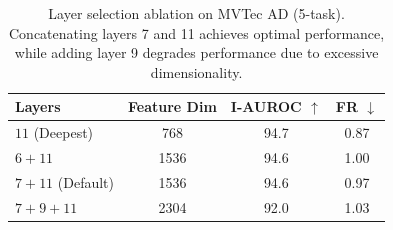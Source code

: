 \begin{table}[t]
\centering
\caption{Layer selection ablation on MVTec AD (5-task). Concatenating layers 7 and 11 achieves optimal performance, while adding layer 9 degrades performance due to excessive dimensionality.}
\label{tab:layer_ablation}
\begin{tabular}{lccc}
\toprule
Layers & Feature Dim & I-AUROC $\uparrow$ & FR $\downarrow$ \\
\midrule
$11$ (Deepest) & 768 & 94.7 & 0.87 \\
$6 + 11$ & 1536 & 94.6 & 1.00 \\
$7 + 11$ (Default) & 1536 & 94.6 & 0.97 \\
$7 + 9 + 11$ & 2304 & 92.0 & 1.03 \\
\bottomrule
\end{tabular}
\end{table}
